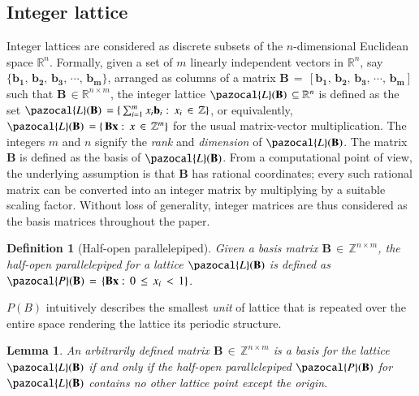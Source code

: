 \documentclass[10pt]{elsarticle}
\newtheorem{lemma}{Lemma}
\newtheorem{definition}{Definition}
\begin{document}
\subsection{Integer lattice}
Integer lattices are considered as discrete subsets of the
$n$-dimensional Euclidean space $\mathbb{{R}}^{n}$. Formally, given
a set of $m$ linearly independent vectors in $\mathbb{{R}}^{n}$, say
$\{ \mathbf{b_{1}}, \, \mathbf{b_{2}}, \, \mathbf{b_{3}}, \, \cdots,
\, \mathbf{b_{m}} \}$, arranged as columns of a matrix $\mathbf{B}
\, = \, [\mathbf{b_{1}}, \, \mathbf{b_{2}}, \, \mathbf{b_{3}}, \,
\cdots, \, \mathbf{b_{m}}]$ such that $\mathbf{B} \, \in
\mathbb{R}^{n \times m}$, the integer lattice
$\pazocal{L}(\mathbf{B}) \, \subseteq \mathbb{R}^{n}$ is defined as
the set $\pazocal{L}(\mathbf{B})\, = \{ \,
\sum_{i=1}^{m}x_{i}\mathbf{b}_{i}: \, x_{i} \, \in \, \mathbb{Z}
\}$, or equivalently,  $\pazocal{L}(\mathbf{B})\, = \{ \, \mathbf{B}
\mathbf{x}: \, x \, \in \, \mathbb{Z}^{m} \}$ for the usual
matrix-vector multiplication. The integers $m$ and $n$ signify the
\emph{rank} and \emph{dimension} of $\pazocal{L}(\mathbf{B})$. The
matrix $\mathbf{B}$ is defined as the basis of
$\pazocal{L}(\mathbf{B})$. From a computational point of view, the
underlying assumption is that $\mathbf{B}$ has rational coordinates;
every such rational matrix can be converted into an integer matrix
by multiplying by a suitable scaling factor. Without loss of
generality, integer matrices are thus considered as the basis
matrices throughout the paper.

\begin{definition}[Half-open parallelepiped]
\normalfont Given a basis matrix $\mathbf{B} \, \in \, \mathbb{Z}^{n
\times m}$, the half-open parallelepiped for a lattice
$\pazocal{L}(\mathbf{B})$ is defined as $\pazocal{P}(\mathbf{B}) \,
= \, \{\mathbf{B}\mathbf{x}: \, 0 \, \leq \, x_{i} \, < \, 1 \}$.
\end{definition}

$P(B)$ intuitively describes the smallest \textit{unit} of lattice that is repeated over the entire space rendering the lattice its periodic structure.

\begin{lemma}
\normalfont An arbitrarily defined matrix $\mathbf{B} \, \in \,
\mathbb{Z}^{n \times m}$ is a basis for the lattice
$\pazocal{L}(\mathbf{B})$ if and only if the half-open
parallelepiped $\pazocal{P}(\mathbf{B})$ for
$\pazocal{L}(\mathbf{B})$ contains no other lattice point except the
origin.
\end{lemma}
\end{document}
